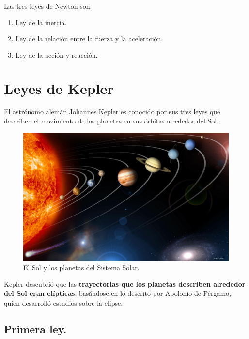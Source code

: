 \documentclass[14pt]{extarticle}
\newcommand{\textocolor}[2]{\textbf{\textcolor{#1}{#2}}}
\begin{document}
Las tres leyes de Newton son:
\begin{enumerate}
\item Ley de la inercia.
\item Ley de la relación entre la fuerza y la aceleración.
\item Ley de la acción y reacción.
\end{enumerate}

\section{Leyes de Kepler}
    
El astrónomo alemán Johannes Kepler es conocido por sus tres leyes que describen el movimiento de los planetas en sus órbitas alrededor del Sol.

\begin{figure}[H]
    \centering
    \includegraphics[scale=0.25]{Imagenes/Kepler_01.jpg}
    \caption{El Sol y los planetas del Sistema Solar.}
\end{figure}

Kepler descubrió que las \textocolor{cobalt}{trayectorias que los planetas describen alrededor del Sol eran elípticas},  basándose en lo descrito por Apolonio de Pérgamo, quien desarrolló estudios sobre la elipse.

\subsection{Primera ley.}
\end{document}
